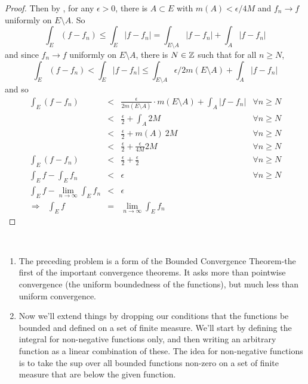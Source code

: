 \begin{pblm}
\begin{proof}
	Then by , for any $\epsilon > 0$, there is $A \subset E$ with $m(A) < \epsilon/4M$ and 
	$f_n \rightarrow f$ uniformly on $E \setminus A$. So 
	\begin{equation*}
		\int_E (f - f_n) \le \int_E |f - f_n| = \int_{E \setminus A} |f-f_n| + \int_A|f-f_n|
	\end{equation*}
	and since $f_n\rightarrow f$ uniformly on $E \setminus A$, there is $N \in \mathbb{Z}$ such that 
	for all $n \ge N$, 
	\begin{equation*}
		\int_E (f - f_n) < \int_E|f-f_n|\le \int_{E \setminus A} \epsilon/2m(E\setminus A) + \int_A|f-f_n|
	\end{equation*}
	and so 
	\begin{equation*}
	\begin{array}{rclr}
		 \int_E(f-f_n) & < & \frac{\epsilon}{2m(E\setminus A)} \cdot m(E\setminus A) + \int_A|f-f_n| & \forall n \ge N\\
		 & < & \frac{\epsilon}{2} + \int_A 2M & \forall n \ge N\\
		 & < & \frac{\epsilon}{2} + m(A) ~ 2M & \forall n \ge N\\
		 & < & \frac{\epsilon}{2} + \frac{\epsilon}{4M} 2M & \forall n \ge N\\
		 \int_E(f-f_n) & < & \frac{\epsilon}{2} + \frac{\epsilon}{2} & \forall n \ge N\\
		 \int_Ef-\int_Ef_n & < & \epsilon  & \forall n \ge N\\
		 \int_Ef-\lim\limits_{n\to\infty}\int_Ef_n & < & \epsilon  & \\
	\Rightarrow~~~  \int_E f & = & \lim\limits_{n\to\infty}\int_Ef_n
	\end{array}
	\end{equation*}
\end{proof}
\end{pblm}

\begin{rmk}~ %
\begin{enumerate}
	\item The preceding problem is a form of the Bounded Convergence Theorem-the first of 
	the important convergence theorems. It asks more than pointwise convergence (the 
	uniform boundedness of the functions), but much less than uniform convergence. 
	\item Now we'll extend things by dropping our conditions that the functions be bounded 
	and defined on a set of finite measure. We'll start by defining the integral for non-negative 
	functions only, and then writing an arbitrary function as a linear combination of these. The 
	idea for non-negative functions is to take the sup over all bounded functions non-zero on a set 
	of finite measure that are below the given function.
\end{enumerate}
\end{rmk}

